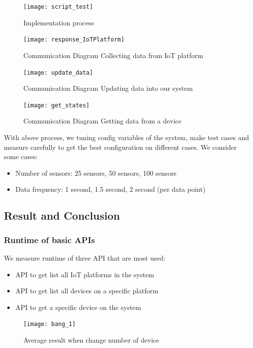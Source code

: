 \documentclass[runningheads,a4paper]{llncs}
\begin{document}
\begin{figure}[H]
\centering
\texttt{[image: script\_test]} 
\caption{Implementation process}
\end{figure} 


\begin{figure}[H]
\centering
\texttt{[image: response\_IoTPlatform]} 
\caption{Communication Diagram Collecting data from IoT platform}
\end{figure} 


\begin{figure}[H]
\centering
\texttt{[image: update\_data]} 
\caption{Communication Diagram Updating data into our system}
\end{figure} 


\begin{figure}[H]
\centering
\texttt{[image: get\_states]} 
\caption{Communication Diagram Getting data from a device}
\end{figure} 


With above process, we tuning config variables of the system, make test cases and measure carefully to get the best configuration on different cases. We consider some cases:

\begin{itemize}
\item Number of sensors: 25 sensors, 50 sensors, 100 sensors
\item Data frequency: 1 second, 1.5 second, 2 second (per data point)
\end{itemize}   


\subsection{Result and Conclusion}
\subsubsection{Runtime of basic APIs}

We measure runtime of three API that are  most used:

\begin{itemize}
\item API to get list all IoT platforms in the system
\item API to get list all devices on a specific platform
\item API to get a specific device on the system
\end{itemize}




\begin{figure}[H]
\centering
\texttt{[image: bang\_1]} 
\caption{Average result when change number of device}
\end{figure} 
\end{document}

